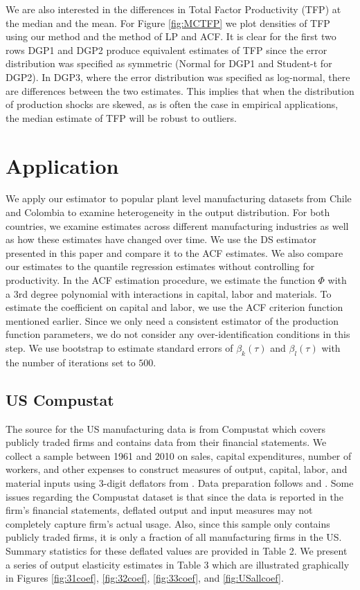 \documentclass[11pt]{article}
\begin{document}
We are also interested in the differences in Total Factor Productivity (TFP) at the median and the mean. For Figure \ref{fig:MCTFP} we plot densities of TFP using our method and the method of LP and ACF. It is clear for the first two rows DGP1 and DGP2 produce equivalent estimates of TFP since the error distribution was specified as symmetric (Normal for DGP1 and Student-t for DGP2). In DGP3, where the error distribution was specified as log-normal, there are differences between the two estimates. This implies that when the distribution of production shocks are skewed, as is often the case in empirical applications, the median estimate of TFP will be robust to outliers. 

\section{Application} \label{application}
We apply our estimator to popular plant level manufacturing datasets from Chile and Colombia to examine heterogeneity in the output distribution. For both countries, we examine estimates across different manufacturing industries as well as how these estimates have changed over time. We use the DS estimator presented in this paper and compare it to the ACF estimates. We also compare our estimates to the quantile regression estimates without controlling for productivity. In the ACF estimation procedure, we estimate the function $\Phi$ with a 3rd degree polynomial with interactions in capital, labor and materials. To estimate the coefficient on capital and labor, we use the ACF criterion function mentioned earlier. Since we only need a consistent estimator of the production function parameters, we do not consider any over-identification conditions in this step. We use bootstrap to estimate standard errors of $\beta_{k}(\tau)$ and $\beta_{l}(\tau)$ with the number of iterations set to $500$.
\subsection{US Compustat}
The source for the US manufacturing data is from Compustat which covers publicly traded firms and contains data from their financial statements. We collect a sample between 1961 and 2010 on sales, capital expenditures, number of workers, and other expenses to construct measures of output, capital, labor, and material inputs using 3-digit deflators from \cite{nber}. Data preparation follows \cite{Keller2009} and \cite{mert}. Some issues regarding the Compustat dataset is that since the data is reported in the firm's financial statements, deflated output and input measures may not completely capture firm's actual usage. Also, since this sample only contains publicly traded firms, it is only a fraction of all manufacturing firms in the US. Summary statistics for these deflated values are provided in Table 2. We present a series of output elasticity estimates in Table 3 which are illustrated graphically in Figures \ref{fig:31coef}, \ref{fig:32coef}, \ref{fig:33coef}, and \ref{fig:USallcoef}.
\end{document}

